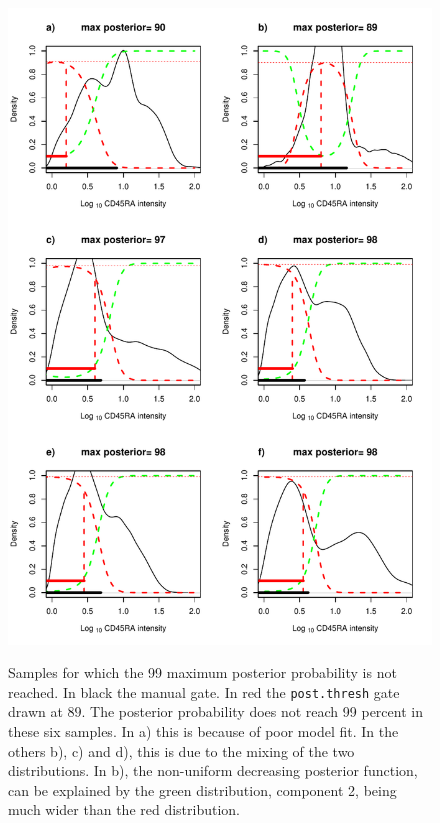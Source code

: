 \begin{figure}[h!]
\centering
\begin{minipage}{.6\textwidth}
  \includegraphics[width=\linewidth]{figures/cd45ra-posterior-threshold-fail.pdf}
\end{minipage}
{Samples for which the 99 maximum posterior probability is not reached.}
{
  In black the manual gate.  In red the \texttt{post.thresh} gate drawn at $89$.
  The posterior probability does not reach 99 percent in these six samples.
  In a) this is because of poor model fit.
  In the others b), c) and d), this is due to the mixing of the two distributions.
  In b), the non-uniform decreasing posterior function, can be explained by the green distribution, component 2,
  being much wider than the red distribution.
}
\end{figure}

